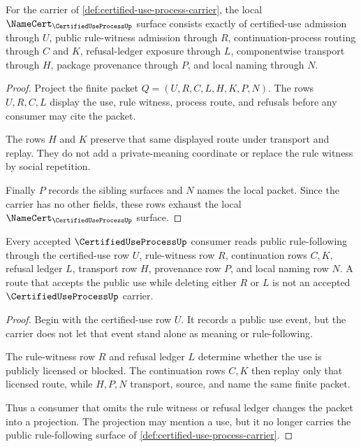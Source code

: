 \begin{theorem}
\label{thm:certified-use-process-namecert-surface}
For the carrier of \autoref{def:certified-use-process-carrier}, the local $\NameCert_{\CertifiedUseProcessUp}$ surface consists exactly of certified-use admission through $U$, public rule-witness admission through $R$, continuation-process routing through $C$ and $K$, refusal-ledger exposure through $L$, componentwise transport through $H$, package provenance through $P$, and local naming through $N$.
\end{theorem}
\begin{proof}
Project the finite packet $Q=(U,R,C,L,H,K,P,N)$. The rows $U,R,C,L$ display the use, rule witness, process route, and refusals before any consumer may cite the packet.

The rows $H$ and $K$ preserve that same displayed route under transport and replay. They do not add a private-meaning coordinate or replace the rule witness by social repetition.

Finally $P$ records the sibling surfaces and $N$ names the local packet. Since the carrier has no other fields, these rows exhaust the local $\NameCert_{\CertifiedUseProcessUp}$ surface.
\end{proof}

\begin{theorem}
\label{thm:certified-use-process-nonprivate-rule-following}
Every accepted $\CertifiedUseProcessUp$ consumer reads public rule-following through the certified-use row $U$, rule-witness row $R$, continuation rows $C,K$, refusal ledger $L$, transport row $H$, provenance row $P$, and local naming row $N$. A route that accepts the public use while deleting either $R$ or $L$ is not an accepted $\CertifiedUseProcessUp$ carrier.
\end{theorem}
\begin{proof}
Begin with the certified-use row $U$. It records a public use event, but the carrier does not let that event stand alone as meaning or rule-following.

The rule-witness row $R$ and refusal ledger $L$ determine whether the use is publicly licensed or blocked. The continuation rows $C,K$ then replay only that licensed route, while $H,P,N$ transport, source, and name the same finite packet.

Thus a consumer that omits the rule witness or refusal ledger changes the packet into a projection. The projection may mention a use, but it no longer carries the public rule-following surface of \autoref{def:certified-use-process-carrier}.
\end{proof}

